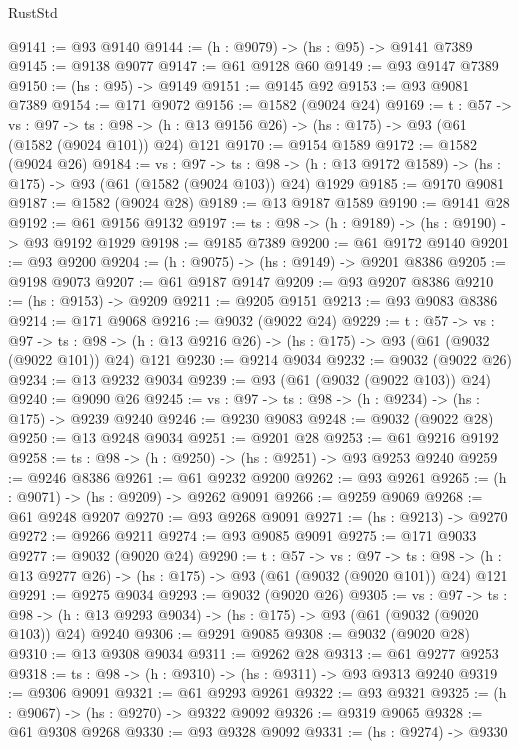 \begin{lexlean}{RustStd}
\begin{coremodule}
@9141 := @93 @9140
@9144 := (h : @9079) -> (hs : @95) -> @9141 @7389
@9145 := @9138 @9077
@9147 := @61 @9128 @60
@9149 := @93 @9147 @7389
@9150 := (hs : @95) -> @9149
@9151 := @9145 @92
@9153 := @93 @9081 @7389
@9154 := @171 @9072
@9156 := @1582 (@9024 @24)
@9169 := {t : @57} ->
  {vs : @97} ->
  {ts : @98} -> (h : @13 @9156 @26) -> (hs : @175) -> @93 (@61 (@1582 (@9024 @101)) @24) @121
@9170 := @9154 @1589
@9172 := @1582 (@9024 @26)
@9184 := {vs : @97} ->
  {ts : @98} -> (h : @13 @9172 @1589) -> (hs : @175) -> @93 (@61 (@1582 (@9024 @103)) @24) @1929
@9185 := @9170 @9081
@9187 := @1582 (@9024 @28)
@9189 := @13 @9187 @1589
@9190 := @9141 @28
@9192 := @61 @9156 @9132
@9197 := {ts : @98} -> (h : @9189) -> (hs : @9190) -> @93 @9192 @1929
@9198 := @9185 @7389
@9200 := @61 @9172 @9140
@9201 := @93 @9200
@9204 := (h : @9075) -> (hs : @9149) -> @9201 @8386
@9205 := @9198 @9073
@9207 := @61 @9187 @9147
@9209 := @93 @9207 @8386
@9210 := (hs : @9153) -> @9209
@9211 := @9205 @9151
@9213 := @93 @9083 @8386
@9214 := @171 @9068
@9216 := @9032 (@9022 @24)
@9229 := {t : @57} ->
  {vs : @97} ->
  {ts : @98} -> (h : @13 @9216 @26) -> (hs : @175) -> @93 (@61 (@9032 (@9022 @101)) @24) @121
@9230 := @9214 @9034
@9232 := @9032 (@9022 @26)
@9234 := @13 @9232 @9034
@9239 := @93 (@61 (@9032 (@9022 @103)) @24)
@9240 := @9090 @26
@9245 := {vs : @97} -> {ts : @98} -> (h : @9234) -> (hs : @175) -> @9239 @9240
@9246 := @9230 @9083
@9248 := @9032 (@9022 @28)
@9250 := @13 @9248 @9034
@9251 := @9201 @28
@9253 := @61 @9216 @9192
@9258 := {ts : @98} -> (h : @9250) -> (hs : @9251) -> @93 @9253 @9240
@9259 := @9246 @8386
@9261 := @61 @9232 @9200
@9262 := @93 @9261
@9265 := (h : @9071) -> (hs : @9209) -> @9262 @9091
@9266 := @9259 @9069
@9268 := @61 @9248 @9207
@9270 := @93 @9268 @9091
@9271 := (hs : @9213) -> @9270
@9272 := @9266 @9211
@9274 := @93 @9085 @9091
@9275 := @171 @9033
@9277 := @9032 (@9020 @24)
@9290 := {t : @57} ->
  {vs : @97} ->
  {ts : @98} -> (h : @13 @9277 @26) -> (hs : @175) -> @93 (@61 (@9032 (@9020 @101)) @24) @121
@9291 := @9275 @9034
@9293 := @9032 (@9020 @26)
@9305 := {vs : @97} ->
  {ts : @98} -> (h : @13 @9293 @9034) -> (hs : @175) -> @93 (@61 (@9032 (@9020 @103)) @24) @9240
@9306 := @9291 @9085
@9308 := @9032 (@9020 @28)
@9310 := @13 @9308 @9034
@9311 := @9262 @28
@9313 := @61 @9277 @9253
@9318 := {ts : @98} -> (h : @9310) -> (hs : @9311) -> @93 @9313 @9240
@9319 := @9306 @9091
@9321 := @61 @9293 @9261
@9322 := @93 @9321
@9325 := (h : @9067) -> (hs : @9270) -> @9322 @9092
@9326 := @9319 @9065
@9328 := @61 @9308 @9268
@9330 := @93 @9328 @9092
@9331 := (hs : @9274) -> @9330

\end{coremodule}
\end{lexlean}

